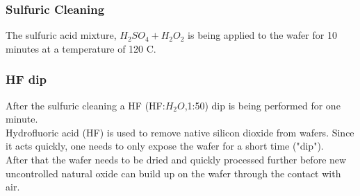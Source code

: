 \subsubsection{Sulfuric Cleaning}
The sulfuric acid mixture, $H_2 S O_4 + H_2 O_2$ is being applied to the wafer for 10 minutes at a temperature of 120 \degree C.

\subsubsection{HF dip}
After the sulfuric cleaning a HF (HF:$H_2O$,1:50) dip is being performed for one minute. \\
Hydrofluoric acid (HF) is used to remove native silicon dioxide from wafers. Since it acts quickly, one needs to only expose the wafer for a short time ("dip"). \\
After that the wafer needs to be dried and quickly processed further before new uncontrolled natural oxide can build up on the wafer through the contact with air.
